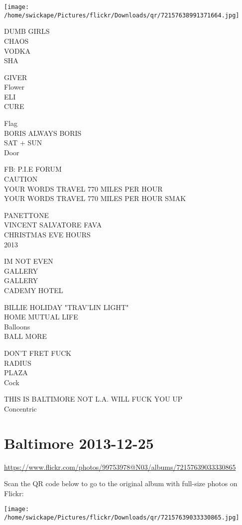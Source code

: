 \documentclass[10pt,letterpaper]{article}
\begin{document}
\texttt{[image: /home/swickape/Pictures/flickr/Downloads/qr/72157638991371664.jpg]}


DUMB GIRLS\\
CHAOS\\
VODKA\\
SHA

GIVER\\
Flower\\
ELI\\
CURE

Flag\\
BORIS ALWAYS BORIS\\
SAT + SUN\\
Door

FB: P.I.E FORUM\\
CAUTION\\
YOUR WORDS TRAVEL 770 MILES PER HOUR\\
YOUR WORDS TRAVEL 770 MILES PER HOUR SMAK

PANETTONE\\
VINCENT SALVATORE FAVA\\
CHRISTMAS EVE HOURS\\
2013

IM NOT EVEN\\
GALLERY\\
GALLERY\\
CADEMY HOTEL

BILLIE HOLIDAY "TRAV'LIN LIGHT"\\
HOME MUTUAL LIFE\\
Balloons\\
BALL MORE

DON'T FRET FUCK\\
RADIUS\\
PLAZA\\
Cock

THIS IS BALTIMORE NOT L.A. WILL FUCK YOU UP\\
Concentric


\section*{Baltimore 2013-12-25}

\url{https://www.flickr.com/photos/99753978@N03/albums/72157639033330865}

Scan the QR code below to go to the original album with full-size photos on Flickr:

\texttt{[image: /home/swickape/Pictures/flickr/Downloads/qr/72157639033330865.jpg]}
\end{document}
